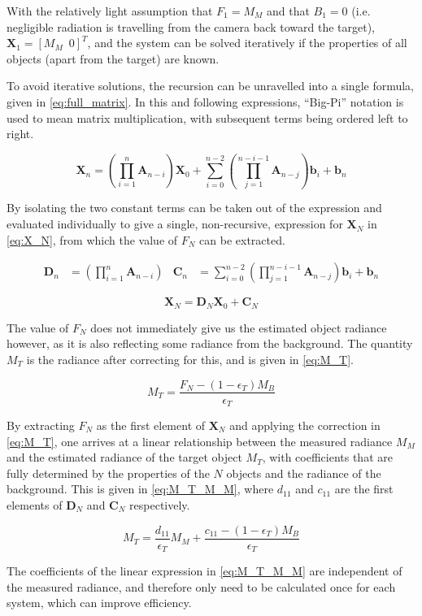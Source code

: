 \documentclass[11pt,a4paper]{article}
\begin{document}
With the relatively light assumption that $ F_1 = M_M $ and that $ B_1 = 0 $ (i.e. negligible radiation is travelling from the camera back toward the target), $ \bm{X}_1 = \left[ M_M \enspace 0\right]^T$, and the system can be solved iteratively if the properties of all objects (apart from the target) are known.

To avoid iterative solutions, the recursion can be unravelled into a single formula, given in \cref{eq:full_matrix}. In this and following expressions, ``Big-Pi'' notation is used to mean matrix multiplication, with subsequent terms being ordered left to right.

\begin{equation}\label{eq:full_matrix}
	\bm{X}_n = \left(\prod_{i=1}^n \bm{A}_{n-i}\right) \bm{X}_0 + \sum_{i=0}^{n-2} \left( \prod_{j=1}^{n-i-1} \bm{A}_{n-j} \right) \bm{b}_i + \bm{b}_n
\end{equation}

By isolating the two constant terms can be taken out of the expression and evaluated individually to give a single, non-recursive, expression for $ \bm{X}_N $ in \cref{eq:X_N}, from which the value of $ F_N $ can be extracted.

\begin{align*}
	\bm{D}_n &= \left(\prod_{i=1}^n \bm{A}_{n-i}\right) &
	\bm{C}_n &= \sum_{i=0}^{n-2} \left( \prod_{j=1}^{n-i-1} \bm{A}_{n-j} \right) \bm{b}_i + \bm{b}_n
\end{align*}

\begin{equation}\label{eq:X_N}
\bm{X}_{N} = \bm{D}_N \bm{X}_0 + \bm{C}_N
\end{equation}

The value of $ F_N $ does not immediately give us the estimated object radiance however, as it is also reflecting some radiance from the background. The quantity $ M_T $ is the radiance after correcting for this, and is given in \cref{eq:M_T}.

\begin{equation}\label{eq:M_T}
	M_T = \frac{F_N - \left(1 - \epsilon_T\right) M_B}{\epsilon_T}
\end{equation}

By extracting $ F_N $ as the first element of $ \bm{X}_N $ and applying the correction in \cref{eq:M_T}, one arrives at a linear relationship between the measured radiance $ M_M $ and the estimated radiance of the target object $ M_T $, with coefficients that are fully determined by the properties of the $ N $ objects and the radiance of the background. This is given in \cref{eq:M_T_M_M}, where $ d_{11} $ and $ c_{11} $ are the first elements of $ \bm{D}_N $ and $ \bm{C}_N $ respectively.

\begin{equation}\label{eq:M_T_M_M}
	M_T = \frac{d_{11}}{\epsilon_T} M_M + \frac{c_{11} - \left(1 - \epsilon_T\right) M_B}{\epsilon_T}
\end{equation}

The coefficients of the linear expression in \cref{eq:M_T_M_M} are independent of the measured radiance, and therefore only need to be calculated once for each system, which can improve efficiency.
\end{document}
